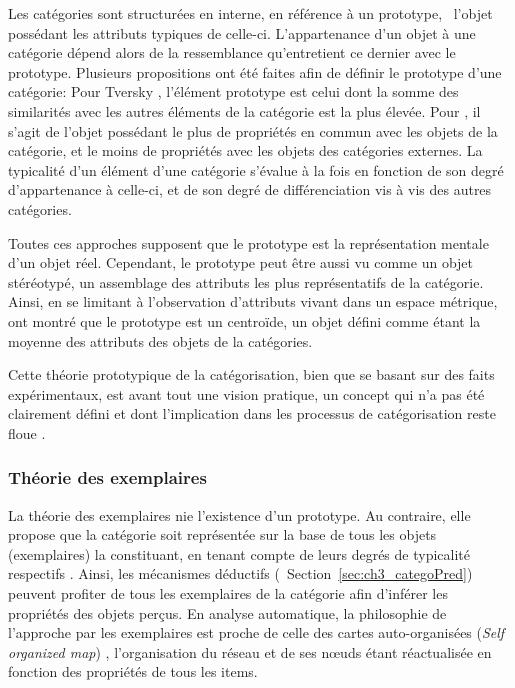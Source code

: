 {Les catégories sont structurées en interne, en référence à un prototype, \ie~l'objet possédant les attributs typiques de celle-ci. L'appartenance d'un objet à une catégorie dépend alors de la ressemblance qu'entretient ce dernier avec le prototype.  Plusieurs propositions ont été faites afin de définir le prototype d'une catégorie: Pour Tversky \citep{tversky1977features}, l'élément prototype est celui dont la somme des similarités avec les autres éléments de la catégorie est la plus élevée. Pour \citep{rosch1975family}, il s'agit de l'objet possédant le plus de propriétés en commun avec les objets de la catégorie, et le moins de propriétés avec les objets des catégories externes. La typicalité d'un élément d'une catégorie s'évalue à la fois en fonction de son degré d'appartenance à celle-ci, et de son degré de différenciation vis à vis des autres catégories. 

Toutes ces approches supposent que le prototype est la représentation mentale d'un objet réel. Cependant, le prototype peut être aussi vu comme un objet stéréotypé, un assemblage des attributs les plus représentatifs de la catégorie. Ainsi, en se limitant à l'observation d'attributs vivant dans un espace métrique, \citep{reed1972pattern, rosch1976structural} ont montré que le prototype est un centroïde, un objet défini comme étant la moyenne des attributs des objets de la catégories. 

Cette théorie prototypique de la catégorisation, bien que se basant sur des faits expérimentaux, est avant tout une vision pratique, un concept qui n'a pas été clairement défini et dont l'implication dans les processus de catégorisation reste floue \citep[p. 36-40]{rosch1978cognition} \citep[p. 49-54]{dubois1991semantique}.

\subsubsection{Théorie des exemplaires}

La théorie des exemplaires nie l'existence d'un prototype. Au contraire, elle propose que la catégorie soit représentée sur la base de tous les objets (exemplaires) la constituant, en tenant compte de leurs degrés de typicalité respectifs \citep{medin1978context,nosofsky1986attention,nosofsky1992similarity}. Ainsi, les mécanismes déductifs (\cf~Section~\ref{sec:ch3_categoPred}) peuvent profiter de tous les exemplaires de la catégorie afin d'inférer les propriétés des objets perçus. En analyse automatique, la philosophie de l'approche par les exemplaires est proche de celle des cartes auto-organisées (\emph{Self organized map}) \citep{kohonen1995som}, l’organisation du réseau et de ses nœuds étant réactualisée en fonction des propriétés de tous les items.

}
